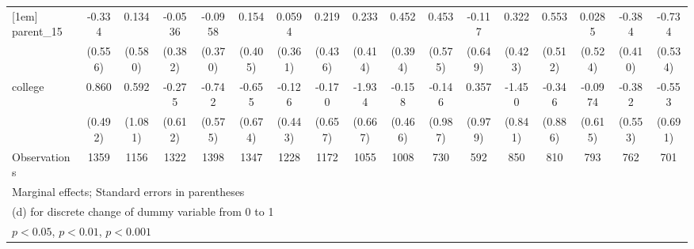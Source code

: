 {\begin{tabular}{l*{16}{c}}
[1em]
parent\_15           &      -0.334         &       0.134         &     -0.0536         &     -0.0958         &       0.154         &      0.0594         &       0.219         &       0.233         &       0.452         &       0.453         &      -0.117         &       0.322         &       0.553         &      0.0285         &      -0.384         &      -0.734         \\
                    &     (0.556)         &     (0.580)         &     (0.382)         &     (0.370)         &     (0.405)         &     (0.361)         &     (0.436)         &     (0.414)         &     (0.394)         &     (0.575)         &     (0.649)         &     (0.423)         &     (0.512)         &     (0.524)         &     (0.410)         &     (0.534)         \\
[1em]
college             &       0.860         &       0.592         &      -0.275         &      -0.742         &      -0.655         &      -0.126         &      -0.170         &      -1.934\sym{**} &      -0.158         &      -0.146         &       0.357         &      -1.450         &      -0.346         &     -0.0974         &      -0.382         &      -0.553         \\
                    &     (0.492)         &     (1.081)         &     (0.612)         &     (0.575)         &     (0.674)         &     (0.443)         &     (0.657)         &     (0.667)         &     (0.466)         &     (0.987)         &     (0.979)         &     (0.841)         &     (0.886)         &     (0.615)         &     (0.553)         &     (0.691)         \\
\hline
Observations        &        1359         &        1156         &        1322         &        1398         &        1347         &        1228         &        1172         &        1055         &        1008         &         730         &         592         &         850         &         810         &         793         &         762         &         701         \\
\hline\hline
\multicolumn{17}{l}{\footnotesize Marginal effects; Standard errors in parentheses}\\
\multicolumn{17}{l}{\footnotesize  (d) for discrete change of dummy variable from 0 to 1}\\
\multicolumn{17}{l}{\footnotesize \sym{*} \(p<0.05\), \sym{**} \(p<0.01\), \sym{***} \(p<0.001\)}\\
\end{tabular}
}
